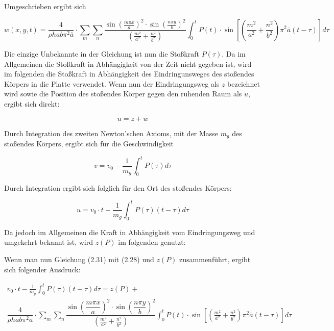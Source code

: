 Umgeschrieben ergibt sich

\begin{equation}
	w(x,y,t) = \dfrac{4}{\rho h a b \pi^2 \overline{a}} \cdot \sum_m \sum_n 
	\dfrac{\sin\left(\frac{m \pi x}{a}\right)^2 \cdot \sin\left(\frac{n \pi y}{b}\right)^2}{\left(\frac{m^2}{a^2} + \frac{n^2}{b^2} \right)} 
	\int_0^t
	P(t)\cdot \sin \left[ \left(\frac{m^2}{a^2} + \frac{n^2}{b^2} \right) \pi^2 \overline{a} (t-\tau)\right] d\tau
\end{equation}


Die einzige Unbekannte in der Gleichung ist nun die Stoßkraft $P(\tau)$. Da im Allgemeinen die Stoßkraft in Abhängigkeit von der Zeit nicht gegeben ist, wird im folgenden die Stoßkraft in Abhängigkeit des Eindringunsweges des stoßendes Körpers in die Platte verwendet. Wenn nun der Eindringungsweg als $z$ bezeichnet wird sowie die Position des stoßendes Körper gegen den ruhenden Raum als $u$, ergibt sich direkt:

\begin{equation}
	u = z + w
\end{equation}


Durch Integration des zweiten Newton'schen Axioms, mit der Masse $m_g$ des stoßendes Körpers, ergibt sich für die Geschwindigkeit 

\begin{equation}
	v = v_0 - \frac{1}{m_g} \int_0^t P(\tau) d\tau
\end{equation}

Durch Integration ergibt sich folglich für den Ort des stoßendes Körpers:

\begin{equation}
	u = v_0 \cdot t - \frac{1}{m_g} \int_0^t P(\tau) (t-\tau) d\tau
\end{equation}


Da jedoch im Allgemeinen die Kraft in Abhängigkeit vom Eindringungsweg und umgekehrt bekannt ist, wird $z(P)$ im folgenden genutzt:

Wenn man nun Gleichung (2.31) mit (2.28) und $z(P)$ zusammenführt, ergibt sich folgender Ausdruck:


\begin{multline}
v_0 \cdot t - \frac{1}{m_g} \int_0^t P(\tau) (t-\tau) d\tau = z(P) + \\ \dfrac{4}{\rho h a b \pi^2 \overline{a}} \cdot \sum_m \sum_n 
\dfrac{\sin\left(\dfrac{m \pi x}{a}\right)^2 \cdot \sin\left(\dfrac{n \pi y}{b}\right)^2}{\left(\frac{m^2}{a^2} + \frac{n^2}{b^2} \right)} 
\int_0^t
P(t)\cdot \sin \left[ \left(\frac{m^2}{a^2} + \frac{n^2}{b^2} \right) \pi^2 \overline{a} (t-\tau)\right] d\tau
\end{multline}

